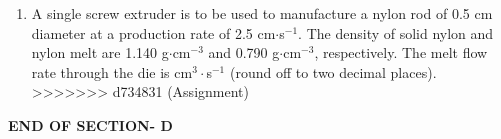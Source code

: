 \documentclass[journal,12pt,onecolumn]{IEEEtran}
\begin{document}
\begin{enumerate}
\vspace{0.5cm}

\item A single screw extruder is to be used to manufacture a nylon rod of 0.5 cm diameter at a production rate of 2.5 cm$\cdot$s$^{-1}$. The density of solid nylon and nylon melt are 1.140 g$\cdot$cm$^{-3}$ and 0.790 g$\cdot$cm$^{-3}$, respectively. The melt flow rate through the die is \underline{\hspace{2cm}} cm$^{3}\cdot$s$^{-1}$ (round off to two decimal places).
\hfill{} \\

\vspace{0.5cm}
>>>>>>> d734831 (Assignment)

\end{enumerate}

\vspace{3\baselineskip}
\begin{center}
    \item[\textbf{END OF SECTION- D}]
\end{center}


\newpage
\end{document}
